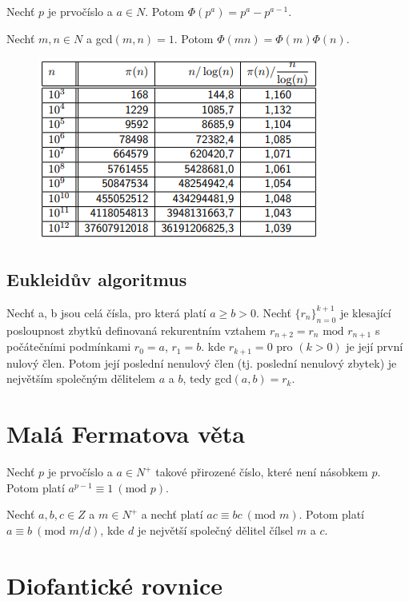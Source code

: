 \documentclass{szzclass}
\begin{document}
Nechť $p$ je prvočíslo a $a \in N$. Potom $\Phi(p^a) = p^a - p^{a-1}$.

Nechť $m, n \in N$ a gcd$(m, n) = 1$. Potom $\Phi(mn) = \Phi(m)\Phi(n)$.



\begin{figure}[!h]
\includegraphics[width=.75\textwidth, center]{topics/bi-spol-33/images/primes.png}
\end{figure}


\subsection{Eukleidův algoritmus}
Nechť a, b jsou celá čísla, pro která platí
$a \geq b > 0$. Nechť $\{r_n\}^{k+1}_{n=0}$ je klesající posloupnost zbytků definovaná
rekurentním vztahem $r_{n+2} = r_n\text{ mod }r_{n+1}$ s počátečními podmínkami $r_0 = a$, $r_1 = b$.
kde $r_{k+1} = 0$ pro $(k > 0)$ je její první nulový člen. Potom její poslední
nenulový člen (tj. poslední nenulový zbytek) je největším společným
dělitelem $a$ a $b$, tedy gcd$ (a, b) = r_k$.

\newpage

\section{Malá Fermatova věta}

Nechť $p$ je prvočíslo a $a \in N^+$ takové přirozené
číslo, které není násobkem $p$. Potom platí $a^{p-1} \equiv 1~(\text{mod }p)$.

Nechť $a, b, c \in Z$ a $m \in N^+$ a nechť platí $ac \equiv bc~(\text{mod } m)$. Potom platí
$a \equiv b~(\text{mod } m/d)$, kde $d$ je největší společný dělitel čílsel $m$ a $c$.


\section{Diofantické rovnice}
\end{document}
